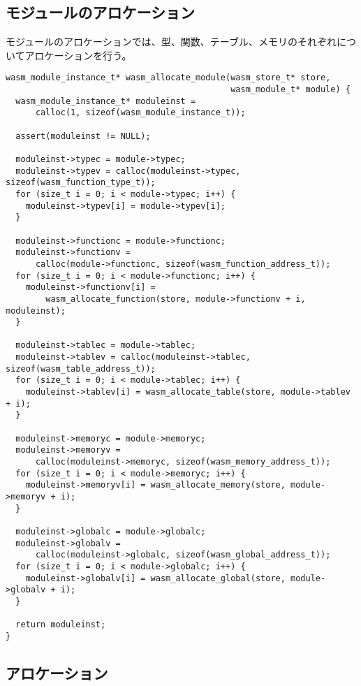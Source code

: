 \subsection{モジュールのアロケーション}

モジュールのアロケーションでは、型、関数、テーブル、メモリのそれぞれについてアロケーションを行う。

\begin{lstlisting}[caption=モジュールのアロケーション,label=lst:parse_sleb128]
wasm_module_instance_t* wasm_allocate_module(wasm_store_t* store,
                                             wasm_module_t* module) {
  wasm_module_instance_t* moduleinst =
      calloc(1, sizeof(wasm_module_instance_t));

  assert(moduleinst != NULL);

  moduleinst->typec = module->typec;
  moduleinst->typev = calloc(moduleinst->typec, sizeof(wasm_function_type_t));
  for (size_t i = 0; i < module->typec; i++) {
    moduleinst->typev[i] = module->typev[i];
  }

  moduleinst->functionc = module->functionc;
  moduleinst->functionv =
      calloc(module->functionc, sizeof(wasm_function_address_t));
  for (size_t i = 0; i < module->functionc; i++) {
    moduleinst->functionv[i] =
        wasm_allocate_function(store, module->functionv + i, moduleinst);
  }

  moduleinst->tablec = module->tablec;
  moduleinst->tablev = calloc(moduleinst->tablec, sizeof(wasm_table_address_t));
  for (size_t i = 0; i < module->tablec; i++) {
    moduleinst->tablev[i] = wasm_allocate_table(store, module->tablev + i);
  }

  moduleinst->memoryc = module->memoryc;
  moduleinst->memoryv =
      calloc(moduleinst->memoryc, sizeof(wasm_memory_address_t));
  for (size_t i = 0; i < module->memoryc; i++) {
    moduleinst->memoryv[i] = wasm_allocate_memory(store, module->memoryv + i);
  }

  moduleinst->globalc = module->globalc;
  moduleinst->globalv =
      calloc(moduleinst->globalc, sizeof(wasm_global_address_t));
  for (size_t i = 0; i < module->globalc; i++) {
    moduleinst->globalv[i] = wasm_allocate_global(store, module->globalv + i);
  }

  return moduleinst;
}
\end{lstlisting}

\subsection{アロケーション}


